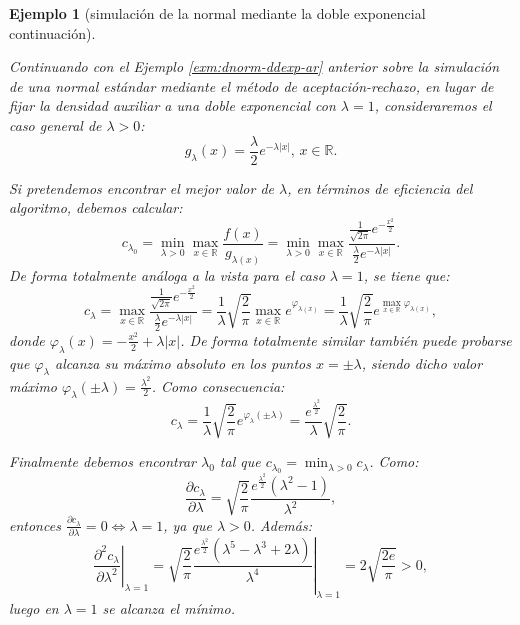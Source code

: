 \documentclass[
]{book}
\theoremstyle{break}
\newtheorem{example}{Ejemplo}[chapter]
\theoremstyle{nonumberplain}
\begin{document}
\begin{example}[simulación de la normal mediante la doble exponencial continuación]
\protect\hypertarget{exm:dnorm-ddexp-arb}{}\label{exm:dnorm-ddexp-arb}

Continuando con el Ejemplo \ref{exm:dnorm-ddexp-ar} anterior sobre la simulación de una normal estándar mediante el método de aceptación-rechazo, en lugar de fijar la densidad auxiliar a una doble exponencial con \(\lambda=1\), consideraremos el caso general de \(\lambda>0\):
\[g_{\lambda}(x)  = \frac{\lambda}{2}e^{-\lambda\left| x \right|} \text{, } x\in\mathbb{R}.\]

Si pretendemos encontrar el mejor valor de \(\lambda\), en términos de eficiencia del algoritmo, debemos calcular:
\[c_{\lambda_{0}} = \min_{\lambda>0}\max_{x\in\mathbb{R}}\frac{f(x)}{g_{\lambda(x)}}
=\min_{\lambda>0}\max_{x\in\mathbb{R}}\frac{\frac{1}{\sqrt{2\pi}}e^{-\frac{x^{2}}{2}}}{\frac{\lambda}{2}e^{-\lambda \left| x \right| }}.\]
De forma totalmente análoga a la vista para el caso \(\lambda=1\), se tiene que:
\[c_{\lambda}=\max_{x\in\mathbb{R}}\frac{\frac{1}{\sqrt{2\pi}}e^{-\frac{x^{2}}{2}}}{\frac{\lambda}{2}e^{-\lambda \left| x \right|  }}=\frac{1}{\lambda}\sqrt{\frac{2}{\pi}}\max_{x\in\mathbb{R}}e^{\varphi
_{\lambda(x)}}=\frac{1}{\lambda}\sqrt{\frac{2}{\pi}}e^{\max_{x\in\mathbb{R}}\varphi_{\lambda(x)} },\]
donde \(\varphi_{\lambda}(x) =-\frac{x^{2}}{2}+\lambda\left| x \right|\).
De forma totalmente similar también puede probarse que \(\varphi_{\lambda}\) alcanza su máximo absoluto en los puntos \(x=\pm\lambda\), siendo dicho valor máximo
\(\varphi_{\lambda}\left( \pm\lambda \right) = \frac{\lambda^{2}}{2}\).
Como consecuencia:
\[c_{\lambda}=\frac{1}{\lambda}\sqrt{\frac{2}{\pi}}e^{\varphi_{\lambda}\left( \pm\lambda \right)} =\frac{e^{\frac{\lambda^{2}}{2}}}{\lambda}\sqrt{\frac{2}{\pi}}.\]

Finalmente debemos encontrar \(\lambda_{0}\) tal que \(c_{\lambda_{0}}=\min_{\lambda>0}c_{\lambda}\).
Como:
\[\frac{\partial c_{\lambda}}{\partial \lambda} =\sqrt{\frac{2}{\pi}}\frac{e^{\frac{\lambda^{2}}{2}}\left( \lambda^{2}-1\right)  }{\lambda^{2}},\]
entonces \(\frac{\partial c_{\lambda}}{\partial \lambda} = 0\Leftrightarrow\lambda=1\), ya que \(\lambda>0\).
Además:
\[\left. \frac{\partial ^{2}c_{\lambda}}{\partial \lambda^{2}}\right|_{\lambda=1} =\left.\sqrt{\frac
{2}{\pi}}\frac{e^{\frac{\lambda^{2}}{2}}\left(  \lambda^{5}-\lambda
^{3}+2\lambda\right)  }{\lambda^{4}}\right|_{\lambda=1}=2\sqrt{\frac{2e}{\pi}}>0,\]
luego en \(\lambda=1\) se alcanza el mínimo.


\end{example}
\end{document}
